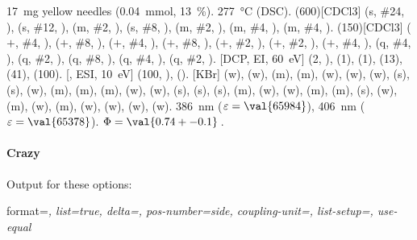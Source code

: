 \documentclass[load-preamble+]{cnltx-doc}
\begin{document}
\begin{experimental}[format=\bfseries,delta=(ppm),list=true,use-equal]
   \SI{17}{\milli\gram} yellow needles (\SI{0.04}{\milli\mole},
  \SI{13}{\percent}).
   \SI{277}{\celsius} (DSC).
  \NMR(600)[CDCl3]  (s, \#{24}, ),  (s, \#{12},
  ),  (m, \#{2}, ),  (s, \#{8},
  ),  (m, \#{2}, ),  (m, \#{4},
  ),  (m, \#{4}, ).
  (150)[CDCl3]  ($+$, \#{4}, ),  ($+$,
  \#{8}, ),  ($+$, \#{4}, ),  ($+$, \#{8},
  ),  ($+$, \#{2}, ),  ($+$, \#{2},
  ),  ($+$, \#{4}, ),  (q, \#{4},
  ),  (q, \#{2}, ),  (q, \#{8}, ),
   (q, \#{4}, ),  (q, \#{2}, ).
  [DCP, EI, \SI{60}{\electronvolt}]  (2, ), 
  (1),  (1),  (13),  (41),  (100).
  [, ESI, \SI{10}{\electronvolt}]  (100,
  ),  ().
  [KBr]  (w),  (w),  (m), 
  (m),  (w),  (w),  (w),  (s),
   (s),  (w),  (m),  (m), 
  (m),  (w),  (w),  (s),  (s),
   (s),  (m),  (w),  (w), 
  (m),  (m),  (s),  (w),  (m), 
  (w),  (m),  (w),  (w),  (w), 
  (w).
   \SI{386}{\nano\metre} ($\varepsilon = \val{65984}$),
  \SI{406}{\nano\metre} ($\varepsilon = \val{65378}$).
   $\Phi = \val{0.74+-0.1}$\,.
\end{experimental}

\paragraph{Crazy}
Output for these options:

\begin{sourcecode}
  format=\color{red}\itshape,
  list=true,
  delta=\textcolor{green}{},
  pos-number=side,
  coupling-unit=\mega\gram\per\square\second,
  list-setup=,
  use-equal
\end{sourcecode}
\end{document}
